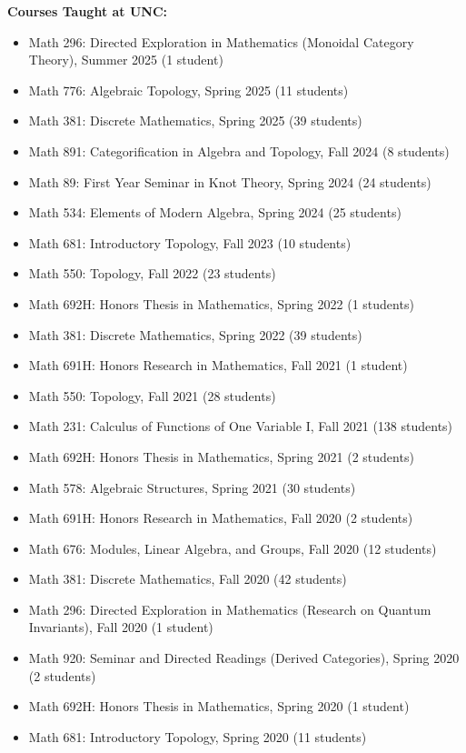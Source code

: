 \documentclass[10pt]{article}
\begin{document}
\smallskip
\noindent\textbf{Courses Taught at UNC:}
\begin{itemize}

\item Math 296: Directed Exploration in Mathematics (Monoidal Category Theory), Summer 2025 (1 student)
\item Math 776: Algebraic Topology, Spring 2025 (11 students)
\item Math 381: Discrete Mathematics, Spring 2025 (39 students)
\item Math 891: Categorification in Algebra and Topology, Fall 2024 (8 students)
\item Math 89: First Year Seminar in Knot Theory, Spring 2024 (24 students) %
\item Math 534: Elements of Modern Algebra, Spring 2024 (25 students)
\item Math 681: Introductory Topology, Fall 2023 (10 students)
\item Math 550: Topology, Fall 2022 (23 students)
\item Math 692H: Honors Thesis in Mathematics, Spring 2022 (1 students)
\item Math 381: Discrete Mathematics, Spring 2022 (39 students)
\item Math 691H: Honors Research in Mathematics, Fall 2021 (1 student)
\item Math 550: Topology, Fall 2021 (28 students)%
\item Math 231: Calculus of Functions of One Variable I, Fall 2021 (138 students)
\item Math 692H: Honors Thesis in Mathematics, Spring 2021 (2 students)
\item Math 578: Algebraic Structures, Spring 2021 (30 students) %
\item Math 691H: Honors Research in Mathematics, Fall 2020 (2 students)
\item Math 676: Modules, Linear Algebra, and Groups, Fall 2020 (12 students)
\item Math 381: Discrete Mathematics, Fall 2020 (42 students)
\item Math 296: Directed Exploration in Mathematics (Research on Quantum Invariants), Fall 2020 (1 student)
\item Math 920: Seminar and Directed Readings (Derived Categories), Spring 2020 (2 students)
\item Math 692H: Honors Thesis in Mathematics, Spring 2020 (1 student)
\item Math 681: Introductory Topology, Spring 2020 (11 students) %

\end{itemize}
\end{document}
